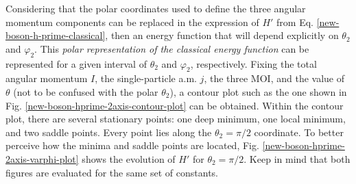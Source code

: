 Considering that the polar coordinates used to define the three angular momentum components can be replaced in the expression of $H'$ from Eq. \ref{new-boson-h-prime-classical}, then an energy function that will depend explicitly on $\theta_2$ and $\varphi_2$. This \emph{polar representation of the classical energy function} can be represented for a given interval of $\theta_2$ and $\varphi_2$, respectively. Fixing the total angular momentum $I$, the single-particle a.m. $j$, the three MOI, and the value of $\theta$ (not to be confused with the polar $\theta_2$), a contour plot such as the one shown in Fig. \ref{new-boson-hprime-2axis-contour-plot} can be obtained. Within the contour plot, there are several stationary points: one deep minimum, one local minimum, and two saddle points. Every point lies along the $\theta_2=\pi/2$ coordinate. To better perceive how the minima and saddle points are located, Fig. \ref{new-boson-hprime-2axis-varphi-plot} shows the evolution of $H'$ for $\theta_2=\pi/2$. Keep in mind that both figures are evaluated for the same set of constants.
